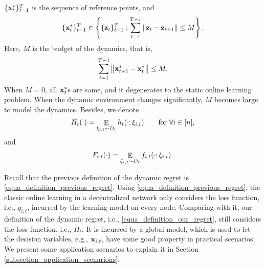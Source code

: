\documentclass{article}
\begin{document}
$\{{\bf x}_t^\ast\}_{t=1}^T$ is the sequence of reference points, and 
\begin{align}
\nonumber
\{{\bf x}_t^\ast\}_{t=1}^T \in \left\{ \{{\bf z}_t\}_{t=1}^{T} : \sum_{t=1}^{T-1} \left\lVert{\bf z}_t - {\bf z}_{t+1}\right\rVert \le M \right\}.
\end{align} Here, $M$ is the budget of the dynamics, that is,
\begin{align}
\label{equa_define_M}
\sum_{t=1}^{T-1} \left\lVert{\bf x}_{t+1}^\ast - {\bf x}_t^\ast\right\rVert \le M.
\end{align} When $M=0$, all ${\bf x}_t^\ast$s are same, and it degenerates to the static online learning problem. When the dynamic environment changes significantly, $M$ becomes large to model the dynamics.  Besides, we denote 
\begin{align}
\nonumber
H_t(\cdot) = \mathop{\mathbb{E}}_{\xi_{i,t} \sim D_t} h_t(\cdot; \xi_{i,t}) {~~~~~~} \text{for } \forall i\in[n],
\end{align} and 
\begin{align}
\nonumber
F_{i,t}(\cdot) = \mathop{\mathbb{E}}_{\xi_{i,t} \sim D_t} f_{i,t}(\cdot; \xi_{i,t}).
\end{align}




{\color{blue}

Recall that the previous definition of the dynamic regret is \eqref{equa_definition_previous_regret}. Using \eqref{equa_definition_previous_regret}, the classic online learning in a decentralized network only considers the loss function, i.e., $g_{i,t}$, incurred by the learning model on every node. Comparing with it, our definition of the dynamic regret, i.e., \eqref{equa_definition_our_regret}, still considers the loss function, i.e., $H_t$. It is incurred by a global model, which is used to let the decision variables, e.g., ${\bf x}_{i,t}$, have some good property in practical scenarios.  We present some application scenarios to explain it in Section \ref{subsection_application_scenarions}. 
}
\end{document}
